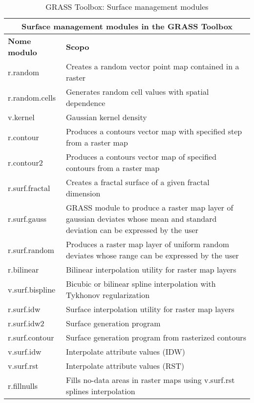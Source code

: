 \begin{table}[ht]
\centering
\caption{GRASS Toolbox: Surface management modules}\medskip
 \begin{tabular}{|p{4cm}|p{12cm}|}
  \hline \multicolumn{2}{|c|}{\textbf{Surface management modules in the GRASS
  Toolbox}} \\
  \hline \textbf{Nome modulo} & \textbf{Scopo} \\
  \hline r.random & Creates a random vector point map contained in a raster \\
  \hline r.random.cells & Generates random cell values with spatial
  dependence \\
  \hline v.kernel & Gaussian kernel density \\
  \hline r.contour & Produces a contours vector map with specified step from
  a raster map\\
  \hline r.contour2 & Produces a contours vector map of specified contours
  from a raster map \\
  \hline r.surf.fractal & Creates a fractal surface of a given fractal
  dimension\\
  \hline r.surf.gauss & GRASS module to produce a raster map layer of
  gaussian deviates whose mean and standard deviation can be expressed by the
  user \\
  \hline r.surf.random & Produces a raster map layer of uniform random
  deviates whose range can be expressed by the user \\
  \hline r.bilinear & Bilinear interpolation utility for raster map layers \\
  \hline v.surf.bispline & Bicubic or bilinear spline interpolation with
  Tykhonov regularization\\
  \hline r.surf.idw & Surface interpolation utility for raster map layers\\
  \hline r.surf.idw2 & Surface generation program\\
  \hline r.surf.contour & Surface generation program from rasterized contours \\
  \hline v.surf.idw & Interpolate attribute values (IDW) \\
  \hline v.surf.rst & Interpolate attribute values (RST) \\
  \hline r.fillnulls & Fills no-data areas in raster maps using v.surf.rst
  splines interpolation \\
\hline
\end{tabular}
\end{table}

